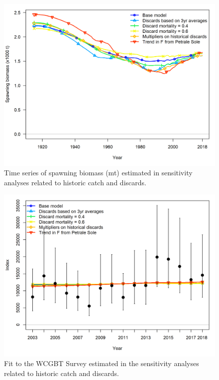 \documentclass[12pt,]{article}
\begin{document}
\begin{figure}
\centering
\includegraphics{Figures/sens.catch_compare1_spawnbio.png}
\caption{Time series of spawning biomass (mt) estimated in sensitivity
analyses related to historic catch and discards.
\label{fig:Sensitivity_catch}}
\end{figure}

\begin{figure}
\centering
\includegraphics{Figures/sens.catch_compare11_indices_flt5.png}
\caption{Fit to the WCGBT Survey estimated in the sensitivity analyses
related to historic catch and discards. \label{fig:Sensitivity_catch2}}
\end{figure}
\end{document}
